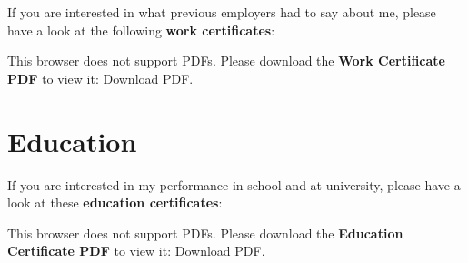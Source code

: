 \documentclass[
]{book}
\begin{document}
If you are interested in what previous employers had to say about me, please have a look at the following \textbf{work certificates}:

This browser does not support PDFs. Please download the \textbf{Work Certificate PDF} to view it: Download PDF.

\hypertarget{education-1}{%
\section{Education}\label{education-1}}

If you are interested in my performance in school and at university, please have a look at these \textbf{education certificates}:

This browser does not support PDFs. Please download the \textbf{Education Certificate PDF} to view it: Download PDF.

  
\end{document}
